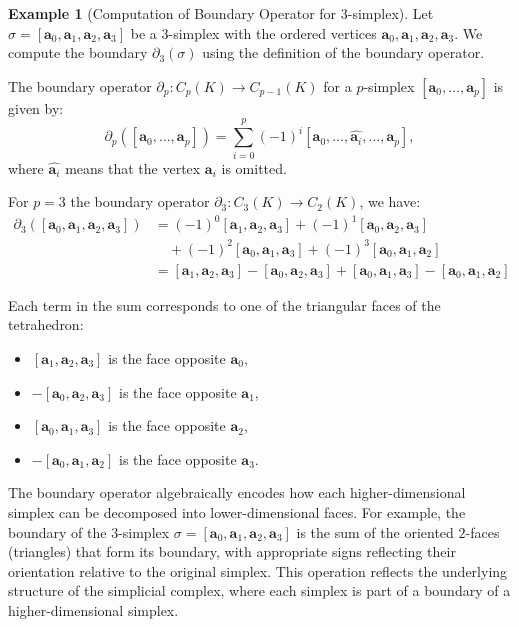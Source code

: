 \documentclass[12pt,oneside,reqno]{amsart}
\theoremstyle{plain}
\theoremstyle{definition}
\newtheorem{example}{Example}[section]
\theoremstyle{remark}
\newcommand{\0}{{\textbf{0}}}
\begin{document}
\begin{example}[Computation of Boundary Operator for 3-simplex]\label{eq:Computation of Boundary Operator for 3 simplex}
Let $\sigma = [\mathbf{a}_0, \mathbf{a}_1, \mathbf{a}_2, \mathbf{a}_3]$ be a $3$-simplex with the ordered vertices $\mathbf{a}_0, \mathbf{a}_1, \mathbf{a}_2, \mathbf{a}_3$. We compute the boundary $\partial_3(\sigma)$ using the definition of the boundary operator.

The boundary operator $\partial_p \colon C_{p}(K) \to C_{p- 1}(K)$ for a $p$-simplex $[\mathbf{a}_0, \dots, \mathbf{a}_p]$ is given by:
\[
\partial_p([\mathbf{a}_0, \dots, \mathbf{a}_p]) = \sum_{i=0}^{p} (-1)^i [\mathbf{a}_0, \dots, \widehat{\mathbf{a}_i}, \dots, \mathbf{a}_p],
\]
where $\widehat{\mathbf{a}_i}$ means that the vertex $\mathbf{a}_i$ is omitted.

For $p = 3$ the boundary operator $\partial_3 \colon C_{3}(K) \to C_{2}(K)$, we have:
\begin{align*}
\partial_3([\mathbf{a}_0, \mathbf{a}_1, \mathbf{a}_2, \mathbf{a}_3]) &= 
(-1)^0 [\mathbf{a}_1, \mathbf{a}_2, \mathbf{a}_3] +
(-1)^1 [\mathbf{a}_0, \mathbf{a}_2, \mathbf{a}_3] \\
&\quad + (-1)^2 [\mathbf{a}_0, \mathbf{a}_1, \mathbf{a}_3] +
(-1)^3 [\mathbf{a}_0, \mathbf{a}_1, \mathbf{a}_2] \\
&= [\mathbf{a}_1, \mathbf{a}_2, \mathbf{a}_3]
- [\mathbf{a}_0, \mathbf{a}_2, \mathbf{a}_3]
+ [\mathbf{a}_0, \mathbf{a}_1, \mathbf{a}_3]
- [\mathbf{a}_0, \mathbf{a}_1, \mathbf{a}_2]
\end{align*}

Each term in the sum corresponds to one of the triangular faces of the tetrahedron:
\begin{itemize}
    \item $[\mathbf{a}_1, \mathbf{a}_2, \mathbf{a}_3]$ is the face opposite $\mathbf{a}_0$,
    \item $-[\mathbf{a}_0, \mathbf{a}_2, \mathbf{a}_3]$ is the face opposite $\mathbf{a}_1$,
    \item $[\mathbf{a}_0, \mathbf{a}_1, \mathbf{a}_3]$ is the face opposite $\mathbf{a}_2$,
    \item $-[\mathbf{a}_0, \mathbf{a}_1, \mathbf{a}_2]$ is the face opposite $\mathbf{a}_3$.
\end{itemize}
The boundary operator algebraically encodes how each higher-dimensional simplex can be decomposed into lower-dimensional faces. For example, the boundary of the $3$-simplex $\sigma = [\mathbf{a}_0, \mathbf{a}_1, \mathbf{a}_2, \mathbf{a}_3]$ is the sum of the oriented $2$-faces (triangles) that form its boundary, with appropriate signs reflecting their orientation relative to the original simplex. This operation reflects the underlying structure of the simplicial complex, where each simplex is part of a boundary of a higher-dimensional simplex.


\end{example}
\end{document}
